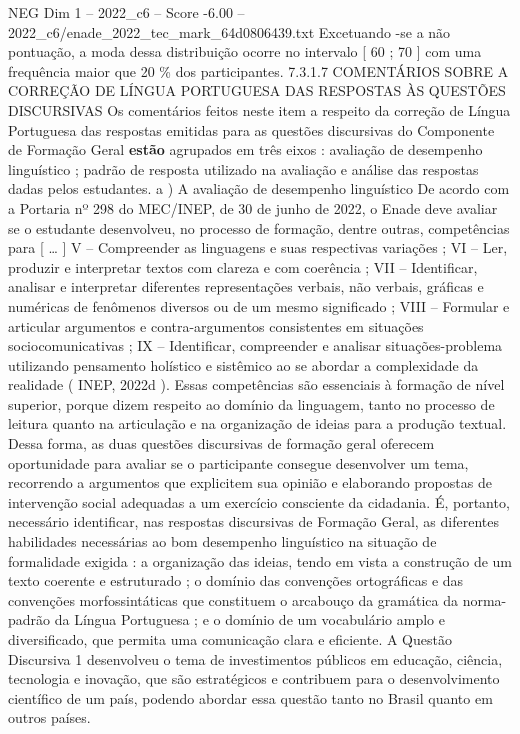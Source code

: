 \begin{textsample}{NEG Dim 1 – 2022\_c6 – Score -6.00 – 2022\_c6/enade\_2022\_tec\_mark\_64d0806439.txt}
Excetuando -se a não pontuação, a moda dessa distribuição ocorre no intervalo [ 60 ; 70 ] com uma frequência maior que 20 \% dos participantes. 7.3.1.7 COMENTÁRIOS SOBRE A CORREÇÃO DE LÍNGUA PORTUGUESA DAS RESPOSTAS ÀS QUESTÕES DISCURSIVAS Os comentários feitos neste item a respeito da correção de Língua Portuguesa das respostas emitidas para as questões discursivas do Componente de Formação Geral \textbf{estão} agrupados em três eixos : avaliação de desempenho linguístico ; padrão de resposta utilizado na avaliação e análise das respostas dadas pelos estudantes. a ) A avaliação de desempenho linguístico De acordo com a Portaria nº 298 do MEC/INEP, de 30 de junho de 2022, o Enade deve avaliar se o estudante desenvolveu, no processo de formação, dentre outras, competências para [ … ] V – Compreender as linguagens e suas respectivas variações ; VI – Ler, produzir e interpretar textos com clareza e com coerência ; VII – Identificar, analisar e interpretar diferentes representações verbais, não verbais, gráficas e numéricas de fenômenos diversos ou de um mesmo significado ; VIII – Formular e articular argumentos e contra-argumentos consistentes em situações sociocomunicativas ; IX – Identificar, compreender e analisar situações-problema utilizando pensamento holístico e sistêmico ao se abordar a complexidade da realidade ( INEP, 2022d ).
Essas competências são essenciais à formação de nível superior, porque dizem respeito ao domínio da linguagem, tanto no processo de leitura quanto na articulação e na organização de ideias para a produção textual.
Dessa forma, as duas questões discursivas de formação geral oferecem oportunidade para avaliar se o participante consegue desenvolver um tema, recorrendo a argumentos que explicitem sua opinião e elaborando propostas de intervenção social adequadas a um exercício consciente da cidadania.
É, portanto, necessário identificar, nas respostas discursivas de Formação Geral, as diferentes habilidades necessárias ao bom desempenho linguístico na situação de formalidade exigida : a organização das ideias, tendo em vista a construção de um texto coerente e estruturado ; o domínio das convenções ortográficas e das convenções morfossintáticas que constituem o arcabouço da gramática da norma-padrão da Língua Portuguesa ; e o domínio de um vocabulário amplo e diversificado, que permita uma comunicação clara e eficiente.
A Questão Discursiva 1 desenvolveu o tema de investimentos públicos em educação, ciência, tecnologia e inovação, que são estratégicos e contribuem para o desenvolvimento científico de um país, podendo abordar essa questão tanto no Brasil quanto em outros países.

\end{textsample}
